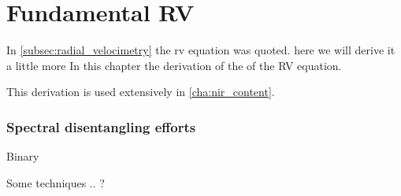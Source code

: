 
\chapter{Fundamental RV}
\label{cha:concepts}


In \cref{subsec:radial_velocimetry} the rv equation was quoted. here we will derive it a little more
In this chapter the derivation of the of the RV equation. 








This derivation is used extensively in \cref{cha:nir_content}.



\subsection{Spectral disentangling efforts}

Binary

Some techniques .. ?

